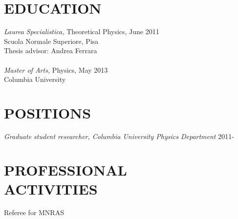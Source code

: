 \documentclass[margin, 10pt]{res} %
\begin{document}
\begin{resume}


\section{EDUCATION}

{\sl Laurea Specialistica,} Theoretical Physics, June 2011 \\
Scuola Normale Superiore, Pisa \\ 
Thesis advisor: Andrea Ferrara \\ \\ 
{\sl Master of Arts,} Physics, May 2013 \\ 
Columbia University
 
 
\section{POSITIONS}

{\sl Graduate student researcher, Columbia University Physics Department} \hfill 2011- \\


\section{PROFESSIONAL \\ ACTIVITIES} 

Referee for MNRAS


\end{resume}
\end{document}
